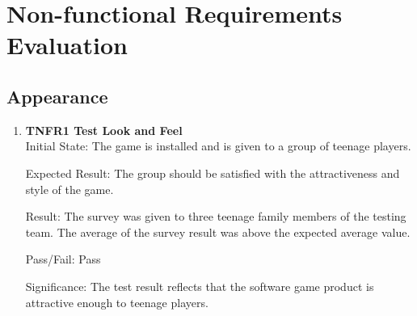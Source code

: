 \documentclass[12pt, titlepage]{article}
\begin{document}
\section{Non-functional Requirements Evaluation}

\subsection{Appearance}
\begin{enumerate}

\item{\textbf{TNFR1 Test Look and Feel\\}}
Initial State: The game is installed and is given to a group of teenage players.

Expected Result: The group should be satisfied with the attractiveness and style of the game.

Result: The survey was given to three teenage family members of the testing team. The average of the survey result was above the expected average value.

Pass/Fail: Pass

Significance: The test result reflects that the software game product is attractive enough to teenage players.

\end{enumerate}
\end{document}
